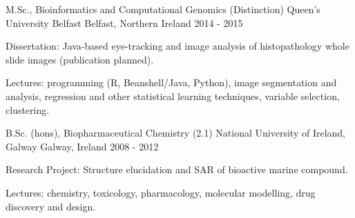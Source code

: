 


\begin{cventries}


\cventry
{M.Sc., Bioinformatics and Computational Genomics (Distinction)} %
{Queen's University Belfast} %
{Belfast, Northern Ireland} %
{2014 - 2015} %
{ %
\begin{cvitems}
\item {Dissertation: Java-based eye-tracking and image analysis of histopathology whole slide images (publication planned).}
\item {Lectures: programming (R, Beanshell/Java, Python), 
image segmentation and analysis, regression and other 
statistical learning techniques, variable selection, clustering.}
\end{cvitems}
}
\cventry
{B.Sc. (hons), Biopharmaceutical Chemistry (2.1)} %
{National University of Ireland, Galway} %
{Galway, Ireland} %
{2008 - 2012} %
{ %
\begin{cvitems}
\item {Research Project: Structure elucidation and SAR of bioactive marine compound.}
\item {Lectures: chemistry, toxicology, pharmacology, molecular modelling,
drug discovery and design.}
\end{cvitems}
}



\end{cventries}
